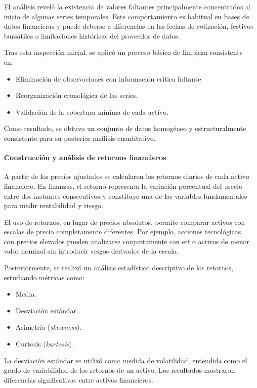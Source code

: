 \documentclass[
]{article}
\begin{document}
El análisis reveló la existencia de valores faltantes principalmente concentrados al inicio de algunas series temporales. Este comportamiento es habitual en bases de datos financieras y puede deberse a diferencias en las fechas de cotización, festivos bursátiles o limitaciones históricas del proveedor de datos.

Tras esta inspección inicial, se aplicó un proceso básico de limpieza consistente en:

\begin{itemize}
\item Eliminación de observaciones con información crítica faltante.
\item Reorganización cronológica de las series.
\item Validación de la cobertura mínima de cada activo.
\end{itemize}

Como resultado, se obtuvo un conjunto de datos homogéneo y estructuralmente consistente para su posterior análisis cuantitativo.

\paragraph{Construcción y análisis de retornos financieros}

A partir de los precios ajustados se calcularon los retornos diarios de cada activo financiero. En finanzas, el retorno representa la variación porcentual del precio entre dos instantes consecutivos y constituye una de las variables fundamentales para medir rentabilidad y riesgo.

El uso de retornos, en lugar de precios absolutos, permite comparar activos con escalas de precio completamente diferentes. Por ejemplo, acciones tecnológicas con precios elevados pueden analizarse conjuntamente con \gls{etf} o activos de menor valor nominal sin introducir sesgos derivados de la escala.

Posteriormente, se realizó un análisis estadístico descriptivo de los retornos, estudiando métricas como:

\begin{itemize}
\item Media.
\item Desviación estándar.
\item Asimetría (\textit{skewness}).
\item Curtosis (\textit{kurtosis}).
\end{itemize}

La desviación estándar se utilizó como medida de volatilidad, entendida como el grado de variabilidad de los retornos de un activo. Los resultados mostraron diferencias significativas entre activos financieros.
\end{document}
